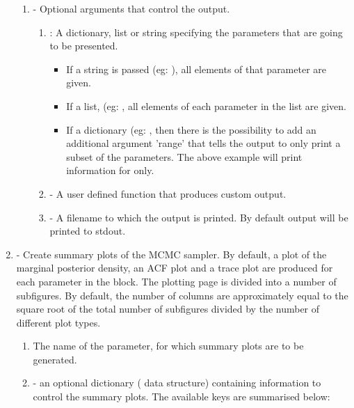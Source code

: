 \documentclass[article]{jss}
\begin{document}
\begin{enumerate}
  \begin{enumerate}
  \item {} - Optional arguments that control the output.
    \begin{enumerate}
    \item {}: A dictionary, list or string specifying the parameters
      that are going to be presented. 
      \begin{itemize}
      \item If a string is passed (eg: ), all elements of that
        parameter are given.
      \item If a list, (eg: , all elements
        of each parameter in the list are given.
      \item If a dictionary (eg: ,
          then there is the possibility to add an additional argument 'range'
          that tells the output to only print a subset of the parameters. The
          above example will print information for  only.
      \end{itemize}
    \item {} - A user defined function that produces custom output. 
    \item {} - A filename to which the output is printed. By default
      output will be printed to stdout.
    \end{enumerate}
    \end{enumerate}
\item {} - Create summary plots of
  the MCMC sampler.  By default, a plot of the marginal posterior
  density, an ACF plot and a trace plot are produced for each
  parameter in the block. The plotting page is divided into a number
  of subfigures. By default, the number of columns are approximately
  equal to the square root of the total number of subfigures divided
  by the number of different plot types.

\begin{enumerate}
\item {} The name of the parameter, for which summary plots are
  to be generated.
\item {} - an optional dictionary ( data
  structure) containing information to control the summary plots. The
  available keys are summarised below:


\end{enumerate}
\end{enumerate}
\end{document}

